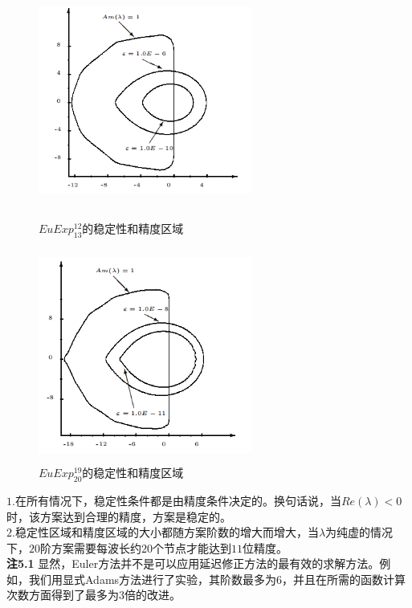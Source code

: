 \documentclass[12pt,a4paper]{article}
\begin{document}
\begin{figure}[H]
	{
		\begin{minipage}{6cm}
			\centering
			\includegraphics[width=7cm,height=7cm]{./figures/3.png}
			\caption{$EuExp_{13}^{12}$的稳定性和精度区域}
			\label{5.3}
		\end{minipage}
	}
	{
		\begin{minipage}{6cm}
			\centering
			\includegraphics[width=7cm,height=7cm]{./figures/4.png}
			\caption{$EuExp_{20}^{19}$的稳定性和精度区域}
			\label{5.4}
		\end{minipage}
	}
\end{figure}

$1$.在所有情况下，稳定性条件都是由精度条件决定的。换句话说，当$Re(\lambda)<0$时，该方案达到合理的精度，方案是稳定的。\\

$2$.稳定性区域和精度区域的大小都随方案阶数的增大而增大，当$\lambda$为纯虚的情况下，$20$阶方案需要每波长约$20$个节点才能达到$11$位精度。\\

\textbf{注5.1} 显然，Euler方法并不是可以应用延迟修正方法的最有效的求解方法。例如，我们用显式Adams方法进行了实验，其阶数最多为$6$，并且在所需的函数计算次数方面得到了最多为$3$倍的改进。\\
\end{document}
